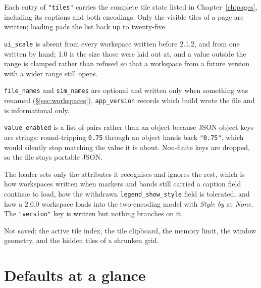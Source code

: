 \documentclass[11pt,a4paper,oneside]{report}
\newcommand{\appver}{2.1.2}
\newcommand{\code}[1]{\texttt{#1}}
\begin{document}
Each entry of \code{"tiles"} carries the complete tile state listed in
Chapter~\ref{ch:pages}, including its captions and both encodings. Only the
visible tiles of a page are written; loading pads the list back up to
twenty-five.

\code{ui\_scale} is absent from every workspace written before \appver{}, and
from one written by hand; 1.0 is the size those were laid out at, and a value
outside the range is clamped rather than refused so that a workspace from a
future version with a wider range still opens.

\code{file\_names} and \code{sim\_names} are optional and written only when
something was renamed (\S\ref{sec:workspaces}). \code{app\_version} records
which build wrote the file and is informational only.

\code{value\_enabled} is a list of pairs rather than an object because JSON
object keys are strings: round-tripping \code{0.75} through an object hands back
\code{"0.75"}, which would silently stop matching the value it is about.
Non-finite keys are dropped, so the file stays portable JSON.

The loader sets only the attributes it recognises and ignores the rest, which is
how workspaces written when markers and bands still carried a caption field
continue to load, how the withdrawn \code{legend\_show\_style} field is
tolerated, and how a 2.0.0 workspace loads into the two-encoding model with
\emph{Style by} at \emph{None}. The \code{"version"} key is written but nothing
branches on it.

Not saved: the active tile index, the tile clipboard, the memory limit, the
window geometry, and the hidden tiles of a shrunken grid.

\chapter{Defaults at a glance}
\end{document}
